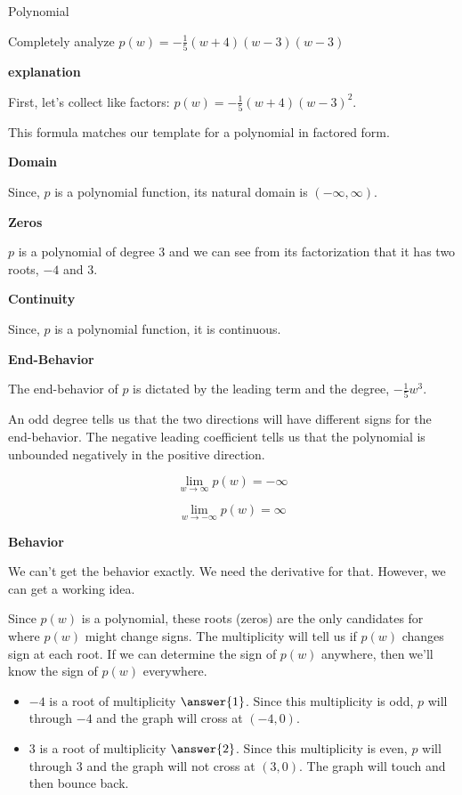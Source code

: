 \documentclass{ximera}
\begin{document}
\begin{example} Polynomial


Completely analyze $p(w) = -\frac{1}{5}(w+4)(w-3)(w-3)$

\textbf{\textcolor{red!75!green}{explanation}} 




First, let's collect like factors: $p(w) = -\frac{1}{5}(w+4)(w-3)^2$.


This formula matches our template for a polynomial in factored form. 

\textbf{Domain}

Since, $p$ is a polynomial function, its natural domain is $(-\infty, \infty)$. 



\textbf{Zeros}



$p$ is a polynomial of degree $3$ and we can see from its factorization that it has two roots, $-4$ and $3$.  




\textbf{Continuity}

Since, $p$ is a polynomial function, it is continuous. 



\textbf{End-Behavior}


The end-behavior of $p$ is dictated by the leading term and the degree, $-\frac{1}{5} w^3$.  

An odd degree tells us that the two directions will have different signs for the end-behavior.  The negative leading coefficient tells us that the polynomial is unbounded negatively in the positive direction.


\[
\lim\limits_{w \to \infty}p(w) = -\infty
\]


\[
\lim\limits_{w \to -\infty}p(w) = \infty
\] 






\textbf{Behavior}

We can't get the behavior exactly.  We need the derivative for that. However, we can get a working idea.

Since $p(w)$ is a polynomial, these roots (zeros) are the only candidates for where $p(w)$ might change signs.  The multiplicity will tell us if $p(w)$ changes sign at each root. If we can determine the sign of $p(w)$ anywhere, then we'll know the sign of $p(w)$ everywhere.

\begin{itemize}
\item $-4$ is a root of multiplicity $\answer{1}$.  Since this multiplicity is odd, $p$ will  through $-4$ and the graph will cross at $(-4,0)$.
\item $3$ is a root of multiplicity $\answer{2}$.  Since this multiplicity is even, $p$ will  through $3$ and the graph will not cross at $(3,0)$.  The graph will touch and then bounce back.
\end{itemize}






\end{example}
\end{document}
